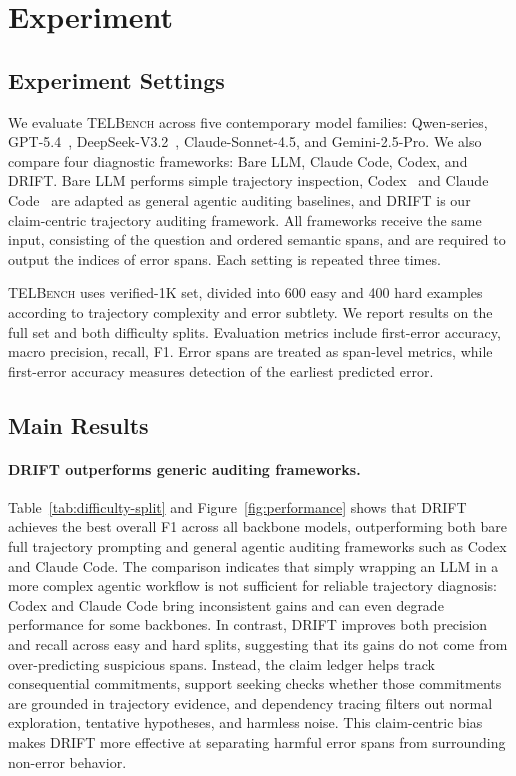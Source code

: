 
\section{Experiment}
\subsection{Experiment Settings}

We evaluate \textsc{TELBench} across five contemporary model families: Qwen-series, GPT-5.4~\citep{openai2026gpt54}, DeepSeek-V3.2~\citep{deepseekai2025deepseekv32pushingfrontieropen}, Claude-Sonnet-4.5, and Gemini-2.5-Pro. We also compare four diagnostic frameworks: Bare LLM, Claude Code, Codex, and \textsc{DRIFT}. Bare LLM performs simple trajectory inspection, Codex~\citep{openai2025codex} and Claude Code~\citep{anthropic2026claudecode} are adapted as general agentic auditing baselines, and \textsc{DRIFT} is our claim-centric trajectory auditing framework. All frameworks receive the same input, consisting of the question and ordered semantic spans, and are required to output the indices of error spans. Each setting is repeated three times.

\textsc{TELBench} uses verified-1K set, divided into 600 easy and 400 hard examples according to trajectory complexity and error subtlety. We report results on the full set and both difficulty splits. Evaluation metrics include first-error accuracy, macro precision, recall, F1. Error spans are treated as span-level metrics, while first-error accuracy measures detection of the earliest predicted error.


\subsection{Main Results}


\paragraph{\textsc{DRIFT} outperforms generic auditing frameworks.}
Table~\ref{tab:difficulty-split} and Figure~\ref{fig:performance} shows that \textsc{DRIFT} achieves the best overall F1 across all backbone models, outperforming both bare full trajectory prompting and general agentic auditing frameworks such as Codex and Claude Code. The comparison indicates that simply wrapping an LLM in a more complex agentic workflow is not sufficient for reliable trajectory diagnosis: Codex and Claude Code bring inconsistent gains and can even degrade performance for some backbones. In contrast, \textsc{DRIFT} improves both precision and recall across easy and hard splits, suggesting that its gains do not come from over-predicting suspicious spans. Instead, the claim ledger helps track consequential commitments, support seeking checks whether those commitments are grounded in trajectory evidence, and dependency tracing filters out normal exploration, tentative hypotheses, and harmless noise. This claim-centric bias makes \textsc{DRIFT} more effective at separating harmful error spans from surrounding non-error behavior.

